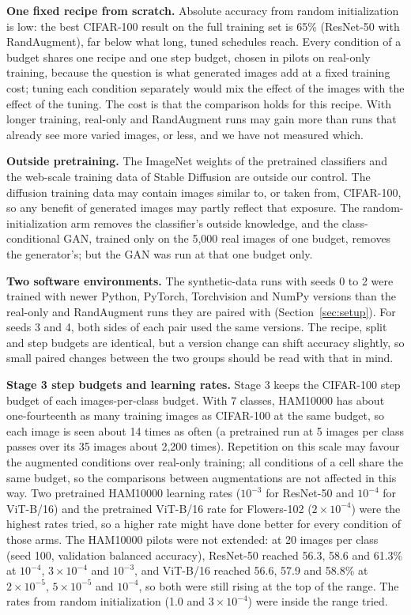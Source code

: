 \textbf{One fixed recipe from scratch.} Absolute accuracy from random initialization is low: the best CIFAR-100 result on the full training set is 65\% (ResNet-50 with RandAugment), far below what long, tuned schedules reach. Every condition of a budget shares one recipe and one step budget, chosen in pilots on real-only training, because the question is what generated images add at a fixed training cost; tuning each condition separately would mix the effect of the images with the effect of the tuning. The cost is that the comparison holds for this recipe. With longer training, real-only and RandAugment runs may gain more than runs that already see more varied images, or less, and we have not measured which.

\textbf{Outside pretraining.} The ImageNet weights of the pretrained classifiers and the web-scale training data of Stable Diffusion are outside our control. The diffusion training data may contain images similar to, or taken from, CIFAR-100, so any benefit of generated images may partly reflect that exposure. The random-initialization arm removes the classifier's outside knowledge, and the class-conditional GAN, trained only on the 5{,}000 real images of one budget, removes the generator's; but the GAN was run at that one budget only.

\textbf{Two software environments.} The synthetic-data runs with seeds 0 to 2 were trained with newer Python, PyTorch, Torchvision and NumPy versions than the real-only and RandAugment runs they are paired with (Section~\ref{sec:setup}). For seeds 3 and 4, both sides of each pair used the same versions. The recipe, split and step budgets are identical, but a version change can shift accuracy slightly, so small paired changes between the two groups should be read with that in mind.

\textbf{Stage 3 step budgets and learning rates.} Stage 3 keeps the CIFAR-100 step budget of each images-per-class budget. With 7 classes, HAM10000 has about one-fourteenth as many training images as CIFAR-100 at the same budget, so each image is seen about 14 times as often (a pretrained run at 5 images per class passes over its 35 images about 2{,}200 times). Repetition on this scale may favour the augmented conditions over real-only training; all conditions of a cell share the same budget, so the comparisons between augmentations are not affected in this way. Two pretrained HAM10000 learning rates ($10^{-3}$ for ResNet-50 and $10^{-4}$ for ViT-B/16) and the pretrained ViT-B/16 rate for Flowers-102 ($2\times10^{-4}$) were the highest rates tried, so a higher rate might have done better for every condition of those arms. The HAM10000 pilots were not extended: at 20 images per class (seed 100, validation balanced accuracy), ResNet-50 reached 56.3, 58.6 and 61.3\% at $10^{-4}$, $3\times10^{-4}$ and $10^{-3}$, and ViT-B/16 reached 56.6, 57.9 and 58.8\% at $2\times10^{-5}$, $5\times10^{-5}$ and $10^{-4}$, so both were still rising at the top of the range. The rates from random initialization (1.0 and $3\times10^{-4}$) were inside the range tried.

